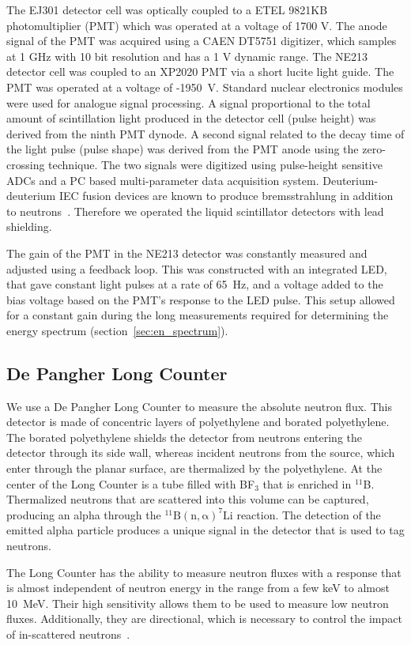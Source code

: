 The EJ301 detector cell was optically coupled to a ETEL 9821KB photomultiplier (PMT) which was operated at a voltage of 1700 V. The anode signal of the PMT was acquired using a CAEN DT5751 digitizer, which samples at 1 GHz with 10 bit resolution and has a 1 V dynamic range. The NE213 detector cell was coupled to an XP2020 PMT via a short lucite light guide. The PMT was operated at a voltage of -1950~V. Standard nuclear electronics modules were used for analogue signal processing. A signal proportional to the total amount of scintillation light produced in the detector cell (pulse height) was derived from the ninth PMT dynode. A second signal related to the decay time of the light pulse (pulse shape) was derived from the PMT anode using the zero-crossing technique. The two signals were digitized using pulse-height sensitive ADCs and a PC based multi-parameter data acquisition system. Deuterium-deuterium IEC fusion devices are known to produce bremsstrahlung in addition to neutrons~\cite{Luo2010}. Therefore we operated the liquid scintillator detectors with lead shielding.

The gain of the PMT in the NE213 detector was constantly measured and adjusted using a feedback loop. This was constructed with an integrated LED, that gave constant light pulses at a rate of \SI{65}{Hz}, and a voltage added to the bias voltage based on the PMT's response to the LED pulse. This setup allowed for a constant gain during the long measurements required for determining the energy spectrum (section~\ref{sec:en_spectrum}).

\subsection{De Pangher Long Counter}
We use a De Pangher Long Counter to measure the absolute neutron flux. This detector is made of concentric layers of polyethylene and borated polyethylene. The borated polyethylene shields the detector from neutrons entering the detector through its side wall, whereas incident neutrons from the source, which enter through the planar surface, are thermalized by the polyethylene. At the center of the Long Counter is a tube filled with BF$_3$ that is enriched in $^{11}$B. Thermalized neutrons that are scattered into this volume can be captured, producing an alpha through the $\mathrm{^{11}B(n, \alpha)^{7}Li}$ reaction. The detection of the emitted alpha particle produces a unique signal in the detector that is used to tag neutrons.

The Long Counter has the ability to measure neutron fluxes with a response that is almost independent of neutron energy in the range from a few keV to almost \SI{10}{MeV}. Their high sensitivity allows them to be used to measure low neutron fluxes. Additionally, they are directional, which is necessary to control the impact of in-scattered neutrons~\cite{nolte2011}.

